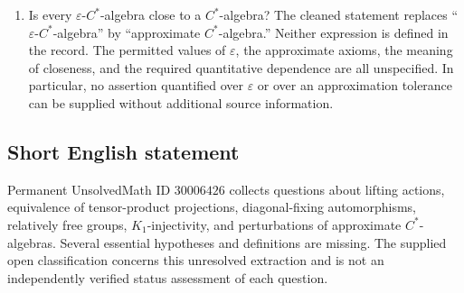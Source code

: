 \documentclass[11pt]{article}
\begin{document}
\begin{enumerate}
\item Is every \(\varepsilon\)-\(C^*\)-algebra close to a \(C^*\)-algebra? The cleaned statement replaces ``\(\varepsilon\)-\(C^*\)-algebra'' by ``approximate \(C^*\)-algebra.'' Neither expression is defined in the record. The permitted values of \(\varepsilon\), the approximate axioms, the meaning of closeness, and the required quantitative dependence are all unspecified. In particular, no assertion quantified over \(\varepsilon\) or over an approximation tolerance can be supplied without additional source information.
\end{enumerate}
\subsection{Short English statement}
Permanent UnsolvedMath ID \(30006426\) collects questions about lifting actions, equivalence of tensor-product projections, diagonal-fixing automorphisms, relatively free groups, \(K_1\)-injectivity, and perturbations of approximate \(C^*\)-algebras. Several essential hypotheses and definitions are missing. The supplied open classification concerns this unresolved extraction and is not an independently verified status assessment of each question.
\end{document}
